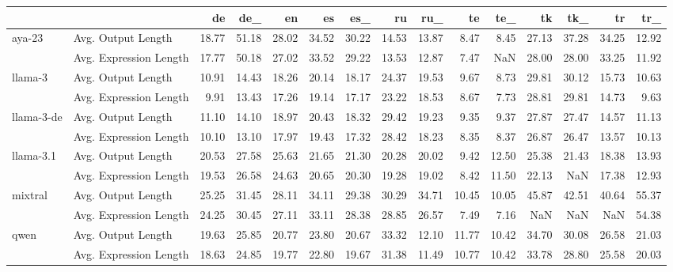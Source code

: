\begin{tabular}{llrrrrrrrrrrrrr}
\toprule
 &  & de & de_ & en & es & es_ & ru & ru_ & te & te_ & tk & tk_ & tr & tr_ \\
\midrule
\multirow[t]{2}{*}{aya-23} & Avg. Output Length & 18.77 & 51.18 & 28.02 & 34.52 & 30.22 & 14.53 & 13.87 & 8.47 & 8.45 & 27.13 & 37.28 & 34.25 & 12.92 \\
 & Avg. Expression Length & 17.77 & 50.18 & 27.02 & 33.52 & 29.22 & 13.53 & 12.87 & 7.47 & NaN & 28.00 & 28.00 & 33.25 & 11.92 \\
\cline{1-15}
\multirow[t]{2}{*}{llama-3} & Avg. Output Length & 10.91 & 14.43 & 18.26 & 20.14 & 18.17 & 24.37 & 19.53 & 9.67 & 8.73 & 29.81 & 30.12 & 15.73 & 10.63 \\
 & Avg. Expression Length & 9.91 & 13.43 & 17.26 & 19.14 & 17.17 & 23.22 & 18.53 & 8.67 & 7.73 & 28.81 & 29.81 & 14.73 & 9.63 \\
\cline{1-15}
\multirow[t]{2}{*}{llama-3-de} & Avg. Output Length & 11.10 & 14.10 & 18.97 & 20.43 & 18.32 & 29.42 & 19.23 & 9.35 & 9.37 & 27.87 & 27.47 & 14.57 & 11.13 \\
 & Avg. Expression Length & 10.10 & 13.10 & 17.97 & 19.43 & 17.32 & 28.42 & 18.23 & 8.35 & 8.37 & 26.87 & 26.47 & 13.57 & 10.13 \\
\cline{1-15}
\multirow[t]{2}{*}{llama-3.1} & Avg. Output Length & 20.53 & 27.58 & 25.63 & 21.65 & 21.30 & 20.28 & 20.02 & 9.42 & 12.50 & 25.38 & 21.43 & 18.38 & 13.93 \\
 & Avg. Expression Length & 19.53 & 26.58 & 24.63 & 20.65 & 20.30 & 19.28 & 19.02 & 8.42 & 11.50 & 22.13 & NaN & 17.38 & 12.93 \\
\cline{1-15}
\multirow[t]{2}{*}{mixtral} & Avg. Output Length & 25.25 & 31.45 & 28.11 & 34.11 & 29.38 & 30.29 & 34.71 & 10.45 & 10.05 & 45.87 & 42.51 & 40.64 & 55.37 \\
 & Avg. Expression Length & 24.25 & 30.45 & 27.11 & 33.11 & 28.38 & 28.85 & 26.57 & 7.49 & 7.16 & NaN & NaN & NaN & 54.38 \\
\cline{1-15}
\multirow[t]{2}{*}{qwen} & Avg. Output Length & 19.63 & 25.85 & 20.77 & 23.80 & 20.67 & 33.32 & 12.10 & 11.77 & 10.42 & 34.70 & 30.08 & 26.58 & 21.03 \\
 & Avg. Expression Length & 18.63 & 24.85 & 19.77 & 22.80 & 19.67 & 31.38 & 11.49 & 10.77 & 10.42 & 33.78 & 28.80 & 25.58 & 20.03 \\
\cline{1-15}
\bottomrule
\end{tabular}
